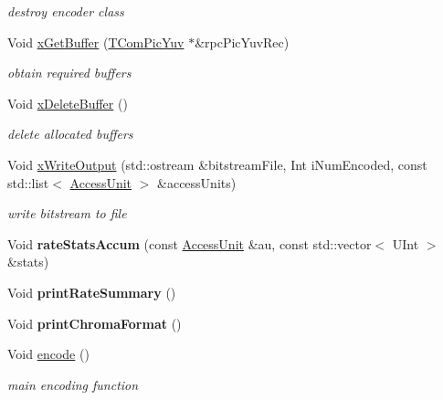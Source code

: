\begin{DoxyCompactItemize}
\begin{DoxyCompactList}\small\item\em destroy encoder class \end{DoxyCompactList}\item 
Void \hyperlink{class_t_app_enc_top_a733e86171af314b24d237a78756e8d06}{x\+Get\+Buffer} (\hyperlink{class_t_com_pic_yuv}{T\+Com\+Pic\+Yuv} $\ast$\&rpc\+Pic\+Yuv\+Rec)
\begin{DoxyCompactList}\small\item\em obtain required buffers \end{DoxyCompactList}\item 
\mbox{\label{class_t_app_enc_top_a5c55c7de47f425ee972a23e44c7120fd}} 
Void \hyperlink{class_t_app_enc_top_a5c55c7de47f425ee972a23e44c7120fd}{x\+Delete\+Buffer} ()
\begin{DoxyCompactList}\small\item\em delete allocated buffers \end{DoxyCompactList}\item 
Void \hyperlink{class_t_app_enc_top_a2160a63710ccc356b36a78969d7ec089}{x\+Write\+Output} (std\+::ostream \&bitstream\+File, Int i\+Num\+Encoded, const std\+::list$<$ \hyperlink{class_access_unit}{Access\+Unit} $>$ \&access\+Units)
\begin{DoxyCompactList}\small\item\em write bitstream to file \end{DoxyCompactList}\item 
\mbox{\label{class_t_app_enc_top_a23b617a85d010ca52f295e46c32fe422}} 
Void {\bfseries rate\+Stats\+Accum} (const \hyperlink{class_access_unit}{Access\+Unit} \&au, const std\+::vector$<$ U\+Int $>$ \&stats)
\item 
\mbox{\label{class_t_app_enc_top_a08caf8316a5c87a0178ca723eb8f0426}} 
Void {\bfseries print\+Rate\+Summary} ()
\item 
\mbox{\label{class_t_app_enc_top_a679530afcffc7a8c72df61b79628ec01}} 
Void {\bfseries print\+Chroma\+Format} ()
\item 
Void \hyperlink{class_t_app_enc_top_ae02a50c8958014ff024234cd454d6cf8}{encode} ()
\begin{DoxyCompactList}\small\item\em main encoding function \end{DoxyCompactList}\end{DoxyCompactItemize}

